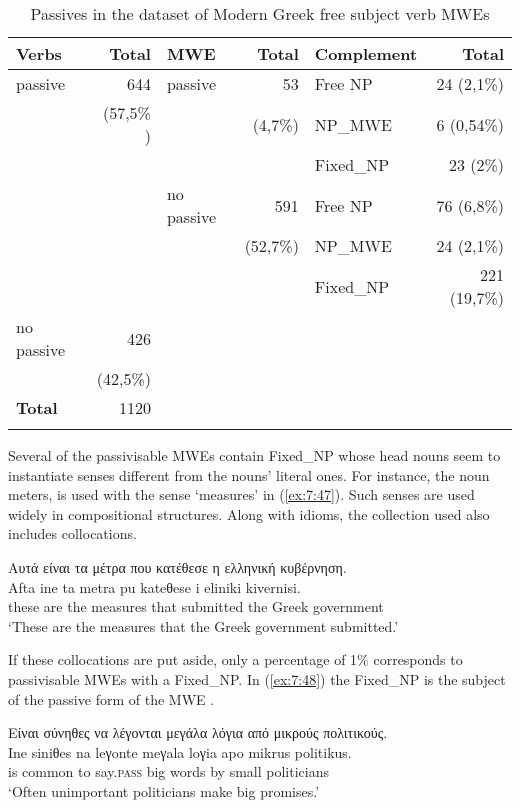 \documentclass[output=paper]{langsci/langscibook}
\begin{document}
\begin{table}
\begin{tabularx}{\textwidth}{Xrlrlr}
\lsptoprule
\textbf{Verbs} & \textbf{Total} & \textbf{MWE} & \textbf{Total} & \textbf{Complement} & \textbf{Total} \\
\midrule 
passive & 644  & passive & 53  & Free NP & 24 (2,1\%) \\
& (57,5\% ) &  & (4,7\%) & NP\_MWE & 6 (0,54\%) \\
&  &  &  & Fixed\_NP & 23 (2\%) \\
&  & { no passive} &  591  & Free NP & 76 (6,8\%) \\
&  &  & (52,7\%) & NP\_MWE & 24 (2,1\%) \\
&  &  &  & Fixed\_NP & 221 (19,7\%) \\
 no passive & 426  &  &  &  &   \\
 & (42,5\%) & &  &  &     \\ \midrule
\textbf{Total}   & 1120 &  &  &  &  \\
\lspbottomrule
\end{tabularx}
\caption{Passives in the dataset of Modern Greek free subject verb MWEs}
\label{tab:2}
\end{table}



Several of the passivisable MWEs contain  Fixed\_NP whose head nouns seem to instantiate senses different from the nouns' literal ones. For instance, the noun  {meters},  is used with the sense `measures' in  (\ref{ex:7:47}).  Such senses are used widely in compositional structures. Along with  idioms, the collection used also includes collocations. 

\ea\label{ex:7:47}
\glll  Αυτά είναι τα μέτρα που κατέθεσε η ελληνική κυβέρνηση. \\
Afta ine ta metra pu kateθese i eliniki kivernisi. \\
          these are the measures that submitted the Greek government \\
\glt `These are the measures that the Greek government submitted.'
\z

If these collocations are put aside, only a percentage of 1\% corresponds to passivisable MWEs with a Fixed\_NP. In (\ref{ex:7:48}) the Fixed\_NP  is the subject of the passive form of the MWE .

\ea\label{ex:7:48}
\glll Είναι σύνηθες να λέγονται μεγάλα λόγια από μικρούς πολιτικούς. \\
Ine siniθes na leγonte meγala loγia apo mikrus politikus. \\
        is common to say.\textsc{pass} big words by small politicians  \\
\glt `Often unimportant politicians make big promises.'\\
\z
\end{document}
